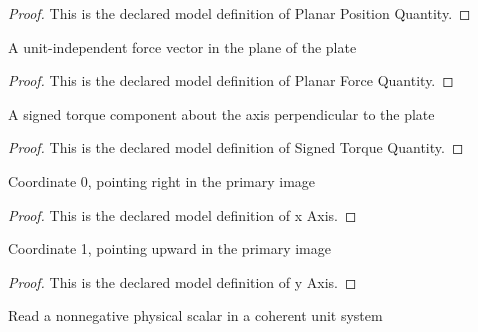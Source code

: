 \begin{proof}
  This is the declared model definition of Planar Position Quantity.
\end{proof}
\begin{definition}
  \label{def:physics:phyx-mini-0777:phyxminiproblems-problemphyxmini0777-planarforcequantity}
  A unit-independent force vector in the plane of the plate
\end{definition}
\begin{proof}
  This is the declared model definition of Planar Force Quantity.
\end{proof}
\begin{definition}
  \label{def:physics:phyx-mini-0777:phyxminiproblems-problemphyxmini0777-signedtorquequantity}
  A signed torque component about the axis perpendicular to the plate
\end{definition}
\begin{proof}
  This is the declared model definition of Signed Torque Quantity.
\end{proof}
\begin{definition}[x Axis]
  \label{def:physics:phyx-mini-0777:phyxminiproblems-problemphyxmini0777-xaxis}
  Coordinate 0, pointing right in the primary image
\end{definition}
\begin{proof}
  This is the declared model definition of x Axis.
\end{proof}
\begin{definition}[y Axis]
  \label{def:physics:phyx-mini-0777:phyxminiproblems-problemphyxmini0777-yaxis}
  Coordinate 1, pointing upward in the primary image
\end{definition}
\begin{proof}
  This is the declared model definition of y Axis.
\end{proof}
\begin{definition}
  \label{def:physics:phyx-mini-0777:phyxminiproblems-problemphyxmini0777-nonnegativereadout}
  Read a nonnegative physical scalar in a coherent unit system
\end{definition}
